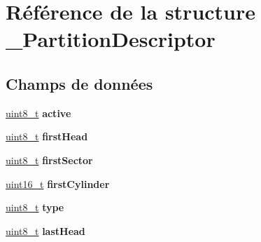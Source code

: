 \hypertarget{struct__PartitionDescriptor}{\section{Référence de la structure \-\_\-\-Partition\-Descriptor}
\label{struct__PartitionDescriptor}
}
\subsection*{Champs de données}
\begin{DoxyCompactItemize}
\item 
\hypertarget{struct__PartitionDescriptor_a7f5b269065ec0ed8f65a1bc00afd712e}{\hyperlink{kernel_2include_2types_8h_aba7bc1797add20fe3efdf37ced1182c5}{uint8\-\_\-t} {\bfseries active}}\label{struct__PartitionDescriptor_a7f5b269065ec0ed8f65a1bc00afd712e}

\item 
\hypertarget{struct__PartitionDescriptor_afb7ff15b362251f2788db0ba5c399f9a}{\hyperlink{kernel_2include_2types_8h_aba7bc1797add20fe3efdf37ced1182c5}{uint8\-\_\-t} {\bfseries first\-Head}}\label{struct__PartitionDescriptor_afb7ff15b362251f2788db0ba5c399f9a}

\item 
\hypertarget{struct__PartitionDescriptor_a0ea29bb1a4577930c23316f4aa76f7fe}{\hyperlink{kernel_2include_2types_8h_aba7bc1797add20fe3efdf37ced1182c5}{uint8\-\_\-t} {\bfseries first\-Sector}}\label{struct__PartitionDescriptor_a0ea29bb1a4577930c23316f4aa76f7fe}

\item 
\hypertarget{struct__PartitionDescriptor_a10bc83fdf064e25cc7aca555f047b70e}{\hyperlink{kernel_2include_2types_8h_adf4d876453337156dde61095e1f20223}{uint16\-\_\-t} {\bfseries first\-Cylinder}}\label{struct__PartitionDescriptor_a10bc83fdf064e25cc7aca555f047b70e}

\item 
\hypertarget{struct__PartitionDescriptor_a2ada512534c41aa57e4bb351d594bfa8}{\hyperlink{kernel_2include_2types_8h_aba7bc1797add20fe3efdf37ced1182c5}{uint8\-\_\-t} {\bfseries type}}\label{struct__PartitionDescriptor_a2ada512534c41aa57e4bb351d594bfa8}

\item 
\hypertarget{struct__PartitionDescriptor_ad88abb3baf9aacb18c2718c186f67d02}{\hyperlink{kernel_2include_2types_8h_aba7bc1797add20fe3efdf37ced1182c5}{uint8\-\_\-t} {\bfseries last\-Head}}\label{struct__PartitionDescriptor_ad88abb3baf9aacb18c2718c186f67d02}


\end{DoxyCompactItemize}
